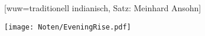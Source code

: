 [wuw={traditionell indianisch, Satz: Meinhard Ansohn}]

\beginverse
\endverse
\texttt{[image: Noten/EveningRise.pdf]}

\endsong

